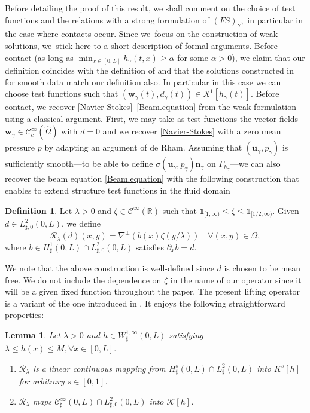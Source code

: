 \documentclass[JEP,XML,SOM,Unicode,NoFloatCountersInSection]{cedram}
\let\mathcal\mathscr
\newtheorem{lemma}[theorem]{Lemma}
\theoremstyle{remark}
\theoremstyle{definition}
\newtheorem{definition}[theorem]{Definition}
\newcommand{\ug}{\boldsymbol{u}}
\newcommand{\wg}{\boldsymbol{w}}
\newcommand{\BS}[1]{\boldsymbol{#1}}
\begin{document}
Before detailing the proof of this result, we shall comment on the choice of test functions and the relations with a strong formulation of $(FS)_\gamma,$ in particular in the case where contacts occur. Since we~focus on the construction of weak solutions, we~stick here to a short description of formal arguments. Before contact (\ie as long as $\min_{x \in [0,L]} h_\gamma(t,x) \geq \bar{\alpha}$ for some $\bar{\alpha} >0$), we claim that our definition coincides with the definition of \cite{Chambolle-etal} and that the solutions constructed in \cite{Grandmont-Hillairet} for smooth data match our definition also. In particular in this case we can choose test functions such that $(\wg_\gamma(t), d_\gamma(t))\in X^1[h_\gamma(t)]$. Before contact,
we recover \eqref{Navier-Stokes}--\eqref{Beam.equation} from the weak formulation using a classical argument. First, we may take as
test functions the vector fields $\wg_\gamma \in \mathcal{C}^{\infty}_c(\hat \Omega)$ with $d = 0$ and we recover \eqref{Navier-Stokes} with a zero mean pressure $p$ by adapting an argument of de Rham. Assuming that
$(\ug_\gamma,p_\gamma)$ is sufficiently smooth---to be able to define $\sigma(\ug_\gamma,p_\gamma) \BS{n}_{\gamma}$
on $\Gamma_{h_{\gamma}}$---we can also recover the beam equation \eqref{Beam.equation} with the following construction that enables to extend structure test functions in the fluid domain

\begin{definition}
\label{def:R}
Let $\lambda >0$ and $\zeta \in \mathcal{C}^{\infty}(\mathbb R)$ such that
$\mathds{1}_{[1,\infty)} \leq \zeta \leq \mathds{1}_{[1/2,\infty)}. $
Given $d\in L_{\sharp,0}^2(0, L)$, we define
\[
\mathcal{R}_\lambda(d)(x,y)= \nabla^{\bot} (b(x) \zeta(y/\lambda)) \quad
\forall (x,y) \in \Omega,
\]
where $b \in H^{1}_{\sharp}(0,L) \cap L^2_{\sharp,0}(0,L)$ satisfies
$\partial_x b = d$.
\end{definition}

We note that the above construction is well-defined since $d$ is chosen to be mean free. We do not include the dependence on $\zeta$ in the name of our operator since it will be a given fixed function throughout the paper. The present lifting operator is a variant of the one introduced in \cite{Chambolle-etal}. It enjoys the following straightforward properties:

\begin{lemma}
Let $\lambda >0$ and $h\in W^{1, \infty}_\sharp(0, L)$ satisfying
$\lambda\leq h(x)\leq M, \forall x\in [0, L]$.
\begin{enumerate}
\item $\mathcal R_{\lambda}$ is a linear continuous mapping from $H^s_{\sharp}(0,L) \cap L^2_{\sharp}(0,L)$ into $K^s[h]$ for arbitrary $s \in [0,1]$.
\item $\mathcal R_{\lambda}$ maps $\mathcal{C}^{\infty}_{\sharp}(0,L) \cap L^2_{\sharp,0}(0,L)$
into $\mathcal K[h]$.
\end{enumerate}
\end{lemma}
\end{document}
